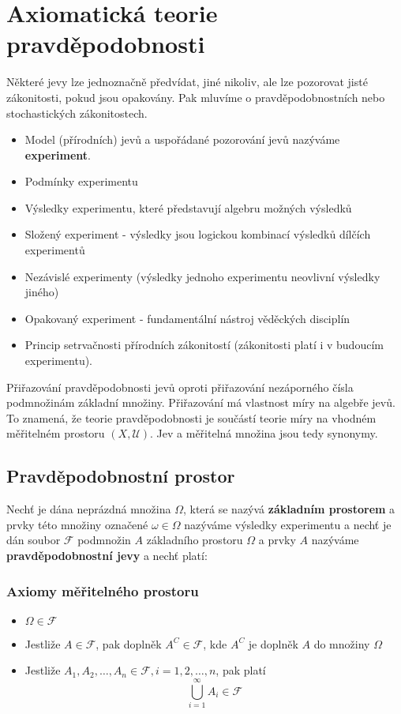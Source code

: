 	\section{Axiomatická teorie pravděpodobnosti}
	Některé jevy lze jednoznačně předvídat, jiné nikoliv, ale lze pozorovat jisté zákonitosti, pokud jsou opakovány. Pak mluvíme o pravděpodobnostních nebo stochastických zákonitostech.

	\begin{itemize}[noitemsep]
		\item Model (přírodních) jevů a uspořádané pozorování jevů nazýváme \textbf{experiment}.
		\item Podmínky experimentu
		\item Výsledky experimentu, které představují algebru možných výsledků
		\item Složený experiment - výsledky jsou logickou kombinací výsledků dílčích experimentů
		\item Nezávislé experimenty (výsledky jednoho experimentu neovlivní výsledky jiného)
		\item Opakovaný experiment - fundamentální nástroj věděckých disciplín
		\item Princip setrvačnosti přírodních zákonitostí (zákonitosti platí i v budoucím experimentu).
	\end{itemize}

	Přiřazování pravděpodobnosti jevů oproti přiřazování nezáporného čísla podmnožinám základní množiny. Přiřazování má vlastnost míry na algebře jevů. To znamená, že teorie pravděpodobnosti je součástí teorie míry na vhodném měřitelném prostoru $(X,\mathscr{U})$. Jev a měřitelná množina jsou tedy synonymy.

	\subsection{Pravděpodobnostní prostor}
	Nechť je dána neprázdná množina $\Omega$, která se nazývá \textbf{základním prostorem} a prvky této množiny označené $\omega\in\Omega$ nazýváme výsledky experimentu a nechť je dán soubor $\mathscr{F}$ podmnožin $A$ základního prostoru $\Omega$ a prvky $A$ nazýváme \textbf{pravděpodobnostní jevy} a nechť platí:

	\subsubsection*{Axiomy měřitelného prostoru}
		\begin{itemize}[noitemsep]
			\item $\Omega\in\mathscr{F}$
			\item Jestliže $A\in\mathscr{F}$, pak doplněk $A^C\in\mathscr{F}$, kde $A^C$ je doplněk $A$ do množiny $\Omega$
			\item Jestliže $A_1,A_2,\ldots, A_n\in\mathscr{F}, i=1,2,\ldots,n$, pak platí
			\[ \bigcup_{i=1}^\infty A_i\in\mathscr{F} \]
		\end{itemize}


